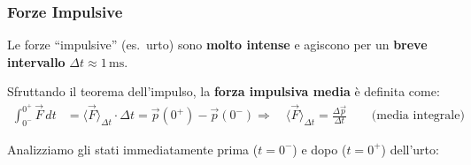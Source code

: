 \subsubsection{Forze Impulsive}
\noindent
Le forze ``impulsive'' (es.\ urto) sono \textbf{molto intense} e
agiscono per un \textbf{breve intervallo} $\Delta t\approx 1\,\mathrm{ms}$.\medskip

\noindent
Sfruttando il teorema dell'impulso, la \textbf{forza impulsiva media}
è definita come:
\begin{align*}
    \int_{0^-}^{0^+}\vec{F}\,dt
        &= \langle\vec{F}\rangle_{\Delta t}\cdot\Delta t
         = \vec{p}(0^+)-\vec{p}(0^-)
    \Longrightarrow\quad
    \boxed{\langle\vec{F}\rangle_{\Delta t} = \frac{\Delta\vec{p}}{\Delta t}}
    \qquad\text{(media integrale)}
\end{align*}

\noindent
Analizziamo gli stati immediatamente prima ($t=0^-$) e dopo ($t=0^+$) dell'urto:

